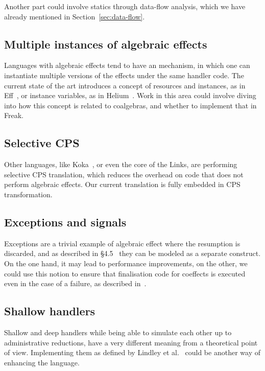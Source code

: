\documentclass[declaration,shortabstract]{iithesis}
\theoremstyle{definition} \newtheorem{definition}{Definition}[chapter]
\theoremstyle{remark} \newtheorem{remark}[definition]{Observation}
\theoremstyle{plain} \newtheorem{theorem}[definition]{Theorem}
\theoremstyle{plain} \newtheorem{lemma}[definition]{Lemma}
\begin{document}
    Another part could involve statics through data-flow analysis, which we
    have already mentioned in Section~\ref{sec:data-flow}.

    \subsection{Multiple instances of algebraic effects}

    Languages with algebraic effects tend to have an mechanism, in which one
    can instantiate multiple versions of the effects under the same handler
    code. The current state of the art introduces a concept of resources and
    instances, as in Eff~\cite{programming-in-eff}, or instance variables, as
    in Helium~\cite{binders-labels}. Work in this area could involve diving
    into how this concept is related to coalgebras, and whether to implement
    that in Freak.

    \subsection{Selective CPS}

    Other languages, like Koka~\cite{leijen-koka}, or even the core of the Links,
    are performing selective CPS translation, which reduces the overhead on code
    that does not perform algebraic effects. Our current translation is fully
    embedded in CPS transformation.

    \subsection{Exceptions and signals}

    Exceptions are a trivial example of algebraic effect where the resumption is
    discarded, and as described in \S 4.5~\cite{handlers-cps} they can be
    modeled as a separate construct. On the one hand, it may lead to
    performance improvements, on the other, we could use this notion to ensure
    that finalisation code for coeffects is executed even in the case of a
    failure, as described in~\cite{runners-in-action}.

    \subsection{Shallow handlers}

    Shallow and deep handlers while being able to simulate each other up to
    administrative reductions, have a very different meaning from a theoretical point
    of view. Implementing them as defined by Lindley et al.~\cite{shallow-handlers}
    could be another way of enhancing the language.



\printbibliography{}
\end{document}
